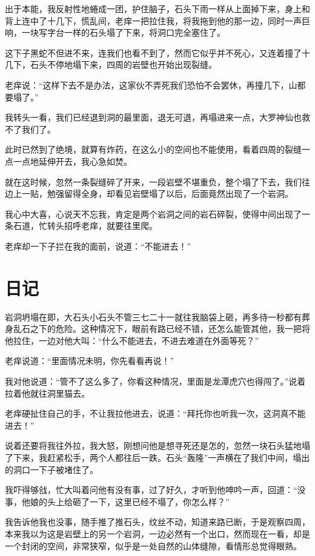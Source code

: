 出于本能，我反射性地蜷成一团，护住脑子，石头下雨一样从上面掉下来，身上和背上连中了十几下，慌乱间，老痒一把拉住我，将我拖到他的那一边，同时一声巨响，一块写字台一样的石头塌了下来，将洞口完全塞住了。

这下子黑蛇不但进不来，连我们也看不到了，然而它似乎并不死心，又连着撞了十几下，石头不停地塌下来，四周的岩壁也开始出现裂缝。

老痒说：“这样下去不是办法，这家伙不弄死我们恐怕不会罢休，再撞几下，山都要塌了。”

我转头一看，我们已经退到洞的最里面，退无可退，再塌进来一点，大罗神仙也救不了我们了。

此时已然到了绝境，就算有炸药，在这么小的空间也不能使用，看着四周的裂缝一点一点地延伸开去，我心急如焚。

就在这时候，忽然一条裂缝碎了开来，一段岩壁不堪重负，整个塌了下去，我们往边上一贴，勉强留得全身，却看见岩壁塌了以后，后面竟然出现了一个岩洞。

我心中大喜，心说天不忘我，肯定是两个岩洞之间的岩石碎裂，使得中间出现了一条石道，忙转头招呼老痒，就要往里爬。

老痒却一下子拦在我的面前，说道：“不能进去！”

\chapter{日记}

岩洞坍塌在即，大石头小石头不管三七二十一就往我脑袋上砸，再多待一秒都有葬身乱石之下的危险。这种情况下，眼前有路已经不错，还怎么能管其他，我一把将他拉住，一边对他大叫：“什么不能进去，不进去难道在外面等死？”

老痒说道：“里面情况未明，你先看看再说！”

我对他说道：“管不了这么多了，你看这种情况，里面是龙潭虎穴也得闯了。”说着拉着他就往洞里猫去。

老痒硬扯住自己的手，不让我拉他进去，说道：“拜托你也听我一次，这洞真不能进去！”

说着还要将我往外拉，我大怒，刚想问他是想寻死还是怎的，忽然一块石头猛地塌了下来，我赶紧松手，两个人都往后一跌。石头“轰隆”一声横在了我们中间，塌出的洞口一下子被堵住了。

我吓得够戗，忙大叫着问他有没有事，过了好久，才听到他呻吟一声，回道：“没事，他娘的头上给砸了一下，这里已经不塌了，你怎么样？”

我告诉他我也没事，随手推了推石头，纹丝不动，知道来路已断，于是观察四周，本来我以为这是岩壁上的另一个岩洞，一边必然有一个出口，然而现在一看，却是一个封闭的空间，非常狭窄，似乎是一处自然的山体缝隙，看情形总觉得眼熟。

